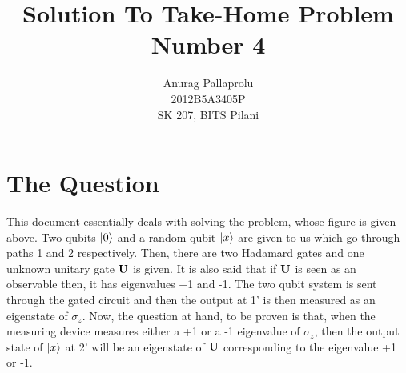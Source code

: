 





\title{Solution To Take-Home Problem Number 4}
\author{Anurag Pallaprolu\\2012B5A3405P\\SK 207, BITS Pilani}
\maketitle
\section{The Question}
This document essentially deals with solving the problem, whose figure is given above. Two qubits $\left| 0 \right>$ and a random qubit $\left| x \right>$ are given to us which go through paths 1 and 2 respectively. Then, there are two Hadamard gates and one unknown unitary gate $\mathbf{U}$ is given. It is also said that if $\mathbf{U}$ is seen as an observable then, it has eigenvalues +1 and -1.  The two qubit system is sent through the gated circuit and then the output at 1' is then measured as an eigenstate of $\sigma_{z}$. Now, the question at hand, to be proven is that, when the measuring device measures either a +1 or a -1 eigenvalue of  $\sigma_{z}$, then the output state of $\left| x \right>$ at 2' will be an eigenstate of $\mathbf{U}$ corresponding to the eigenvalue +1 or -1.
